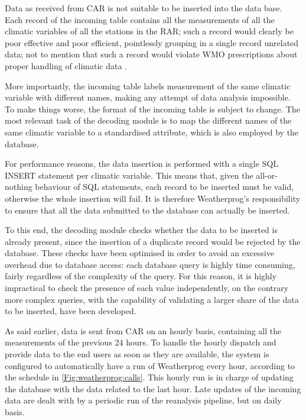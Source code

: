 \documentclass[authoryear,preprint,review,12pt]{elsarticle}
\begin{document}
Data as received from CAR is not suitable to be inserted into the data base. Each record of the incoming table contains all the measurements of all the climatic variables of all the stations in the RAR; such a record would clearly be poor effective and poor efficient, pointlessly grouping in a single record unrelated data; not to mention that such a record would violate WMO prescriptions about proper handling of climatic data \citep{wcdmp:cdms}.
 
 More importantly, the incoming table labels measurement of the same climatic variable with different names, making any attempt of data analysis impossible. To make things worse, the format of the incoming table is subject to change. The most relevant task of the decoding module is to map the different names of the same climatic variable to a standardised attribute, which is also employed by the database.
 
 For performance reasons, the data insertion is performed with a single SQL INSERT statement per climatic variable. This means that, given the all-or-nothing behaviour of SQL statements, each record to be inserted must be valid, otherwise the whole insertion will fail. It is therefore Weatherprog's responsibility to ensure that all the data submitted to the database can actually be inserted.
 
 To this end, the decoding module checks whether the data to be inserted is already present, since the insertion of a duplicate record would be rejected by the database. These checks have been optimised in order to avoid an excessive overhead due to database access: each database query is highly time consuming, fairly regardless of the complexity of the query. For this reason, it is highly impractical to check the presence of each value independently, on the contrary more complex queries, with the capability of validating a larger share of the data to be inserted, have been developed.
 
As said earlier, data is sent from CAR on an hourly basis, containing all the measurements of the previous 24 hours.
To handle the hourly dispatch and provide data to the end users as soon as they are available, the system is configured to automatically have a run of Weatherprog every hour, according to the schedule in \cref{Fig:weatherprog:calls}.
This hourly run is in charge of updating the database with the data related to the last hour.
Late updates of the incoming data are dealt with by a periodic run of the reanalysis pipeline, but on daily basis.
\end{document}
